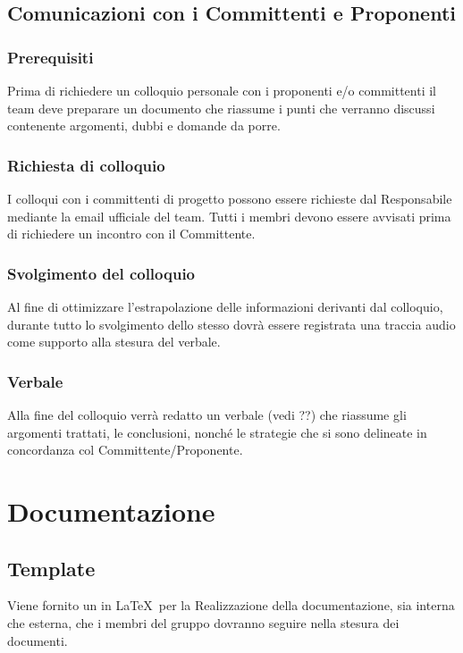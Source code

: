 \subsection{Comunicazioni con i Committenti e Proponenti}
\label{3.4}

\subsubsection{Prerequisiti}
\label{3.4.1}
Prima di richiedere un colloquio personale con i proponenti e/o committenti il team deve preparare un documento che riassume i punti che verranno discussi contenente argomenti, dubbi e domande da porre.

\subsubsection{Richiesta di colloquio}
\label{3.4.2}
I colloqui con i committenti di progetto possono essere richieste dal Responsabile mediante la email ufficiale del team. Tutti i membri devono essere avvisati prima di richiedere un incontro con il Committente.



\subsubsection{Svolgimento del colloquio}
Al fine di ottimizzare l'estrapolazione delle informazioni derivanti dal colloquio, durante tutto lo svolgimento dello stesso dovrà essere registrata una traccia audio come supporto alla stesura del verbale. 

\subsubsection{Verbale}
\label{3.4.3}
Alla fine del colloquio verrà redatto un verbale (vedi ??) che riassume gli argomenti trattati, le conclusioni, nonché le strategie che si sono delineate in concordanza col Committente/Proponente.

\newpage
\section{Documentazione}
\label{5.0}

\subsection{Template}
\label{5.1}
Viene fornito un  in \LaTeX\ per la Realizzazione della documentazione, sia interna che esterna, che i membri del gruppo dovranno seguire nella stesura dei documenti.

